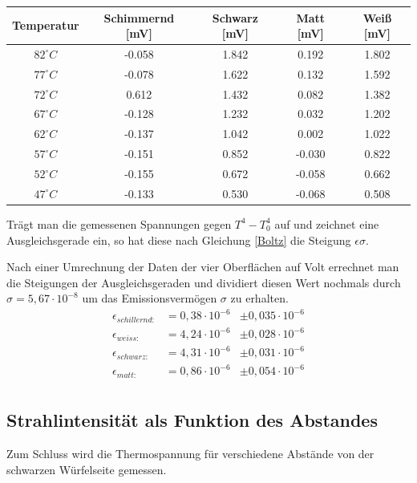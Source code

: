 \begin{table}[H]
\begin{tabular}{|c|c|c|c|c|}
\hline 
Temperatur & Schimmernd [mV] & Schwarz [mV]& Matt [mV]& Weiß [mV]\\ 
\hline 
$82^\circ C$&-0.058	&1.842	&0.192	&1.802\\
\hline
$77^\circ C$&-0.078	&1.622	&0.132	&1.592\\
\hline
$72^\circ C$&0.612	&1.432	&0.082	&1.382\\
\hline
$67^\circ C$&-0.128	&1.232	&0.032	&1.202\\
\hline
$62^\circ C$&-0.137	&1.042	&0.002	&1.022\\
\hline
$57^\circ C$&-0.151	&0.852	&-0.030	&0.822\\
\hline
$52^\circ C$&-0.155	&0.672	&-0.058	&0.662\\
\hline
$47^\circ C$&-0.133	&0.530	&-0.068	&0.508\\ 
\hline
\end{tabular} 
\end{table}

Trägt man die gemessenen Spannungen gegen $T^4-T_0^4$ auf und zeichnet eine Ausgleichsgerade ein, so hat diese nach Gleichung \eqref{Boltz} die Steigung $\epsilon\sigma$.

Nach einer Umrechnung der Daten der vier Oberflächen auf Volt errechnet man die Steigungen der Ausgleichsgeraden und dividiert diesen Wert nochmals durch $\sigma = 5,67\cdot 10^{-8}$ um das Emissionsvermögen $\sigma$ zu erhalten.
\begin{align*}
\epsilon_{schillernd: }		&= 0,38\cdot10^{-6}     &\pm 0,035\cdot 10^{-6}  \\
\epsilon_{weiss: } 			&= 4,24\cdot10^{-6}     &\pm 0,028\cdot 10^{-6}  \\
\epsilon_{schwarz: }	 	&= 4,31\cdot10^{-6}     &\pm 0,031\cdot 10^{-6}  \\
\epsilon_{matt: }		 	&= 0,86\cdot10^{-6}     &\pm 0,054\cdot 10^{-6}  \\
\end{align*} 

\subsection{Strahlintensität als Funktion des Abstandes}
Zum Schluss wird die Thermospannung für verschiedene Abstände von der schwarzen Würfelseite gemessen.


